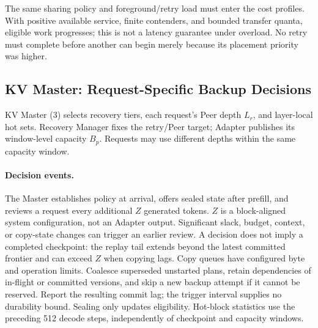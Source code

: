 The same sharing policy and foreground/retry load must enter the cost
profiles. With positive available service, finite contenders, and bounded
transfer quanta, eligible work progresses; this is not a latency guarantee
under overload. No retry must complete before another can begin merely
because its placement priority was higher.
\subsection{KV Master: Request-Specific Backup Decisions}
\label{sec:kv-placement}
\label{sec:kv-master}

KV Master (3) selects recovery tiers, each request's Peer depth $L_r$,
and layer-local hot sets. Recovery Manager fixes the retry/Peer target;
Adapter publishes its window-level capacity $B_p$. Requests may use
different depths within the same capacity window.

\paragraph{Decision events.}
The Master establishes policy at arrival, offers sealed state after prefill,
and reviews a request every additional $Z$ generated tokens. $Z$ is a
block-aligned system configuration, not an Adapter output. Significant
slack, budget, context, or copy-state changes can trigger an earlier review.
A decision does not imply a completed checkpoint: the replay tail extends
beyond the latest committed frontier and can exceed $Z$ when copying lags.
Copy queues have configured byte and operation limits. Coalesce superseded
unstarted plans, retain dependencies of in-flight or committed versions,
and skip a new backup attempt if it cannot be reserved. Report the resulting
commit lag; the trigger interval supplies no durability bound.
Sealing only updates eligibility. Hot-block statistics use the preceding
512 decode steps, independently of checkpoint and capacity windows.

